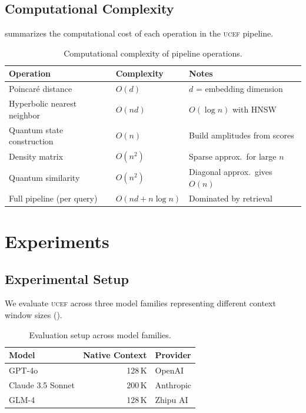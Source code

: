 \documentclass[11pt,letterpaper]{article}
\newcommand{\ucef}{\textsc{ucef}}
\begin{document}
\subsection{Computational Complexity}

 summarizes the computational cost of each operation
in the \ucef{} pipeline.

\begin{table}[t]
\centering
\caption{Computational complexity of pipeline operations.}
\label{tab:complexity}
\small
\begin{tabular}{@{}llp{5.5cm}@{}}
\toprule
Operation & Complexity & Notes \\
\midrule
Poincar\'{e} distance       & $O(d)$          & $d$ = embedding dimension \\
Hyperbolic nearest neighbor  & $O(n d)$        & $O(\log n)$ with HNSW \\
Quantum state construction   & $O(n)$          & Build amplitudes from scores \\
Density matrix               & $O(n^{2})$      & Sparse approx.\ for large $n$ \\
Quantum similarity           & $O(n^{2})$      & Diagonal approx.\ gives $O(n)$ \\
Full pipeline (per query)    & $O(nd + n\log n)$ & Dominated by retrieval \\
\bottomrule
\end{tabular}
\end{table}


\section{Experiments}
\label{sec:experiments}

\subsection{Experimental Setup}

We evaluate \ucef{} across three model families representing different
context window sizes ().

\begin{table}[t]
\centering
\caption{Evaluation setup across model families.}
\label{tab:exp-setup}
\small
\begin{tabular}{@{}lrl@{}}
\toprule
Model & Native Context & Provider \\
\midrule
GPT-4o            & 128\,K & OpenAI \\
Claude 3.5 Sonnet & 200\,K & Anthropic \\
GLM-4             & 128\,K & Zhipu AI \\
\bottomrule
\end{tabular}
\end{table}
\end{document}
